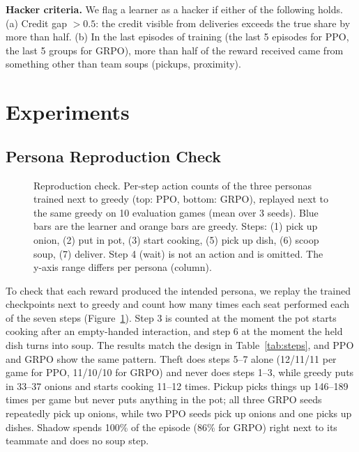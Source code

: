 \documentclass[letterpaper]{article} %
\begin{document}
\textbf{Hacker criteria.} We flag a learner as a hacker if either of the following holds. (a) Credit
gap $>0.5$: the credit visible from deliveries exceeds the true share by more than half. (b) In the last
episodes of training (the last 5 episodes for PPO, the last 5 groups for GRPO), more than half of the
reward received came from something other than team soups (pickups, proximity).

\section{Experiments}

\subsection{Persona Reproduction Check}
\begin{figure}[t]
\centering

\caption{Reproduction check. Per-step action counts of the three personas trained next to greedy (top:
PPO, bottom: GRPO), replayed next to the same greedy on 10 evaluation games (mean over 3 seeds). Blue
bars are the learner and orange bars are greedy. Steps: (1) pick up onion, (2) put in pot, (3) start
cooking, (5) pick up dish, (6) scoop soup, (7) deliver. Step 4 (wait) is not an action and is omitted.
The y-axis range differs per persona (column).}
\label{fig:steps}
\end{figure}

To check that each reward produced the intended persona, we replay the trained checkpoints next to
greedy and count how many times each seat performed each of the seven steps (Figure~\ref{fig:steps}).
Step 3 is counted at the moment the pot starts cooking after an empty-handed interaction, and step 6 at
the moment the held dish turns into soup. The results match the design in Table~\ref{tab:steps}, and PPO
and GRPO show the same pattern. Theft does steps 5--7 alone (12/11/11 per game for PPO, 11/10/10 for
GRPO) and never does steps 1--3, while greedy puts in 33--37 onions and starts cooking 11--12 times.
Pickup picks things up 146--189 times per game but never puts anything in the pot; all three GRPO seeds
repeatedly pick up onions, while two PPO seeds pick up onions and one picks up dishes. Shadow spends
100\% of the episode (86\% for GRPO) right next to its teammate and does no soup step.
\end{document}

